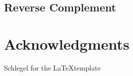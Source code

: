 \documentclass[10pt,letterpaper]{article}
\begin{document}
\subsection*{Reverse Complement}



\section*{Acknowledgments}
Schlegel for the \LaTeX template %

\nolinenumbers




\end{document}

